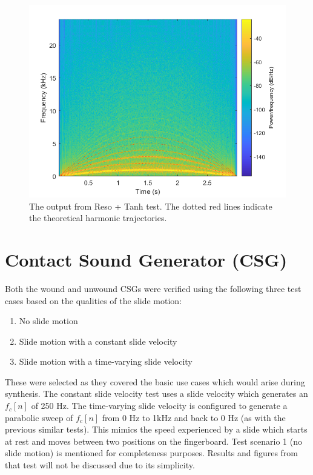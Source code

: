 \documentclass[../main.tex]{subfiles}
\begin{document}
\begin{figure}[h]
    \centering
    \includegraphics[scale=.65]{./images/plots/ResoTanhTest.png}
    \caption{The output from Reso + Tanh test. The dotted red lines indicate the theoretical harmonic trajectories.}
    \label{fig:ResoTanhTest}
\end{figure}

\section{Contact Sound Generator (CSG)}
Both the wound and unwound CSGs were verified using the following three test cases based on the qualities of the slide motion:

\begin{enumerate}
    \item No slide motion
    \item Slide motion with a constant slide velocity
    \item Slide motion with a time-varying slide velocity
\end{enumerate}

These were selected as they covered the basic use cases which would arise during synthesis. The constant slide velocity test uses a slide velocity which generates an $f_c[n]$ of 250 Hz. The time-varying slide velocity is configured to generate a parabolic sweep of $f_c[n]$ from 0 Hz to 1kHz and back to 0 Hz (as with the previous similar tests). This mimics the speed experienced by a slide which starts at rest and moves between two positions on the fingerboard. Test scenario 1 (no slide motion) is mentioned for completeness purposes. Results and figures from that test will not be discussed due to its simplicity.
\end{document}
